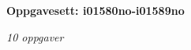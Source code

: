 \centerline{\bf Oppgavesett: i01580no-i01589no}
\vskip 10pt
\centerline{\it 10 oppgaver}\vskip 10pt
\vskip 10pt
